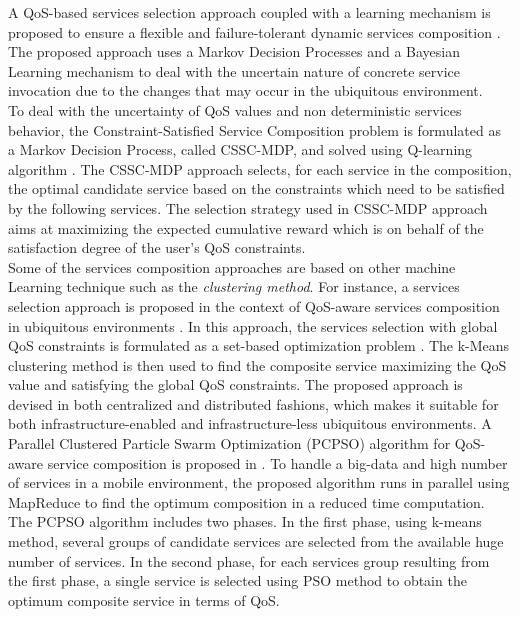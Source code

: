 \documentclass[10pt,journal,compsoc]{IEEEtran}
\begin{document}
A QoS-based services selection approach coupled with a learning mechanism is proposed to ensure a flexible and failure-tolerant dynamic services composition \cite{yachir2009qos}. The proposed approach uses a Markov Decision Processes and a Bayesian Learning mechanism to deal with the uncertain nature of concrete service invocation due to the changes that may occur in the ubiquitous environment.\\

To deal with the uncertainty of QoS values and non deterministic services behavior, the Constraint-Satisfied Service Composition problem is formulated as a Markov Decision Process, called CSSC-MDP, and solved using Q-learning algorithm \cite{ren2017reinforcement}. The CSSC-MDP approach selects, for each service in the composition, the optimal candidate service based on the constraints which need to be satisfied by the following services. The selection strategy used in CSSC-MDP approach aims at maximizing the expected cumulative reward which is on behalf of the satisfaction degree of the user's QoS constraints.\\

Some of the services composition approaches are based on other machine Learning technique such as the \textit{clustering method}. For instance, a services selection approach is proposed in the context of QoS-aware services composition in ubiquitous environments \cite{mabrouk2015set}. In this approach, the services selection with global QoS constraints is formulated as a set-based optimization problem \cite{zitzler2010set}. The k-Means clustering method is then used to find the composite service maximizing the QoS value and satisfying the global QoS constraints. The proposed approach is devised in both centralized and distributed fashions, which makes it suitable for both infrastructure-enabled and infrastructure-less ubiquitous environments. A Parallel Clustered Particle Swarm Optimization (PCPSO) algorithm for QoS-aware service composition is proposed in \cite{hossain2016big}. To handle a big-data and high number of services in a mobile environment, the proposed algorithm runs in parallel using MapReduce \cite{dean2008mapreduce} to find the optimum composition in a reduced time computation. The PCPSO algorithm includes two phases. In the first phase, using k-means method, several groups of candidate services are selected from the available huge number of services. In the second phase, for each services group resulting from the first phase, a single service is selected using PSO method to obtain the optimum composite service in terms of QoS.
\end{document}
